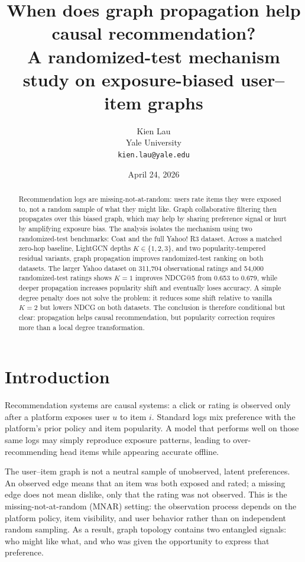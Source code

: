 \documentclass[10pt]{article}
\title{\textbf{When does graph propagation help causal recommendation?}\\[0.3em]
\large A randomized-test mechanism study on exposure-biased user--item graphs}
\author{Kien Lau \\
  Yale University \\
  \texttt{kien.lau@yale.edu}
}
\date{April 24, 2026}
\begin{document}
\maketitle

\begin{abstract}
Recommendation logs are missing-not-at-random: users rate items they were exposed to, not a random sample of what they might like. Graph collaborative filtering then propagates over this biased graph, which may help by sharing preference signal or hurt by amplifying exposure bias. The analysis isolates the mechanism using two randomized-test benchmarks: Coat and the full Yahoo! R3 dataset. Across a matched zero-hop baseline, LightGCN depths $K\in\{1,2,3\}$, and two popularity-tempered residual variants, graph propagation improves randomized-test ranking on both datasets. The larger Yahoo dataset on 311{,}704 observational ratings and 54{,}000 randomized-test ratings shows $K=1$ improves NDCG@5 from 0.653 to 0.679, while deeper propagation increases popularity shift and eventually loses accuracy. A simple degree penalty does not solve the problem: it reduces some shift relative to vanilla $K=2$ but lowers NDCG on both datasets. The conclusion is therefore conditional but clear: propagation helps causal recommendation, but popularity correction requires more than a local degree transformation.
\end{abstract}

\section{Introduction}
\label{sec:intro}

Recommendation systems are causal systems: a click or rating is observed only after a platform exposes user $u$ to item $i$. Standard logs mix preference with the platform's prior policy and item popularity. A model that performs well on those same logs may simply reproduce exposure patterns, leading to over-recommending head items while appearing accurate offline.

The user--item graph is not a neutral sample of unobserved, latent preferences. An observed edge means that an item was both exposed and rated; a missing edge does not mean dislike, only that the rating was not observed. This is the missing-not-at-random (MNAR) setting: the observation process depends on the platform policy, item visibility, and user behavior rather than on independent random sampling. As a result, graph topology contains two entangled signals: who might like what, and who was given the opportunity to express that preference.
\end{document}
